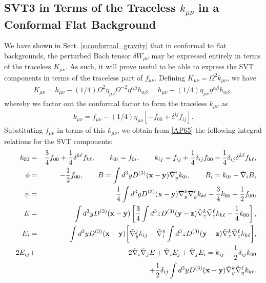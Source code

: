 \subsection{SVT3 in Terms of the Traceless $k_{\mu\nu}$ in a Conformal Flat Background}
\label{ss:svt3_in_terms_of_k_mu_nu}
We have shown in Sect. \ref{s:conformal_gravity} that in conformal to flat backgrounds, the perturbed Bach tensor $\delta W_{\mu\nu}$ may be expressed entirely in terms of the traceless $K_{\mu\nu}$. As such, it will prove useful to be able to express the SVT components in terms of the traceless part of $f_{\mu\nu}$. Defining $K_{\mu\nu}=\Omega^2k_{\mu\nu}$, we have
\begin{eqnarray}
K_{\mu\nu}=h_{\mu\nu}-(1/4)\Omega^2\eta_{\mu\nu}\Omega^{-2}\eta^{\alpha\beta}h_{\alpha\beta}=h_{\mu\nu}-(1/4)\eta_{\mu\nu}\eta^{\alpha\beta}h_{\alpha\beta},
\end{eqnarray}
whereby we factor out the conformal factor to form the traceless $k_{\mu\nu}$ as
\begin{eqnarray}
k_{\mu\nu}=f_{\mu\nu}-(1/4)\eta_{\mu\nu}[-f_{00}+\delta^{ij}f_{ij}].
\end{eqnarray}
%
Substituting $f_{\mu\nu}$ in terms of this $k_{\mu\nu}$, we obtain from \eqref{AP65} the following integral relations for the SVT components:
\begin{eqnarray}
k_{00}&=&\frac{3}{4}f_{00}+\frac{1}{4}\delta^{k\ell}f_{k\ell},\qquad k_{0i}=f_{0i},\qquad k_{ij}=f_{ij}+\frac{1}{4}\delta_{ij}f_{00}-\frac{1}{4}\delta_{ij}\delta^{k\ell}f_{k\ell},
\nonumber\\
\phi&=&-\frac{1}{2}f_{00},\qquad
B=\int d^3yD^{(3)}(\mathbf{x}-\mathbf{y})\tilde{\nabla}_y^ik_{0i},\qquad B_i=k_{0i}-\tilde{\nabla}_iB,
\nonumber\\
\psi&=&\frac{1}{4}\int d^3yD^{(3)}(\mathbf{x}-\mathbf{y})\tilde{\nabla}_y^k\tilde{\nabla}_y^{\ell}k_{k\ell}-\frac{3}{4}k_{00}+\frac{1}{2}f_{00},
\nonumber\\
\qquad
E&=&\int d^3yD^{(3)}(\mathbf{x}-\mathbf{y})\left[\frac{3}{4}\int d^3zD^{(3)}(\mathbf{y}-\mathbf{z})\tilde{\nabla}_z^k\tilde{\nabla}_z^{\ell}k_{k\ell}-\frac{1}{4}k_{00}\right],
\nonumber\\
E_i&=&\int d^3yD^{(3)}(\mathbf{x}-\mathbf{y})\bigg{[}\tilde{\nabla}_y^jk_{ij}
-\tilde{\nabla}^y_i\int d^3zD^{(3)}(\mathbf{y}-\mathbf{z})\tilde{\nabla}_z^k\tilde{\nabla}_z^{\ell}k_{k\ell}\bigg{]},
\nonumber\\
2E_{ij}&+&2\tilde{\nabla}_i\tilde{\nabla}_j E +\tilde{\nabla}_i E_j +\tilde{\nabla}_j E_i
=k_{ij}-\frac{1}{2}\delta_{ij}k_{00}
\nonumber\\
&&\qquad\qquad\qquad\qquad\qquad\qquad+\frac{1}{2}\delta_{ij}\int d^3yD^{(3)}(\mathbf{x}-\mathbf{y})\tilde{\nabla}_y^k\tilde{\nabla}_y^{\ell}k_{k\ell}.
\label{AP66}
\end{eqnarray}
